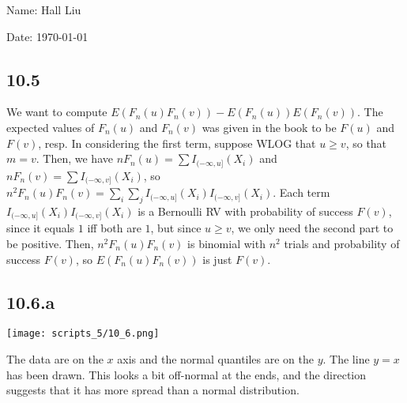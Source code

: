 \documentclass{article}
\begin{document}
Name: Hall Liu

Date: \today 
\vspace{1.5cm}

\subsection*{10.5}
We want to compute $E(F_n(u)F_n(v))-E(F_n(u))E(F_n(v))$. The expected values of $F_n(u)$ and $F_n(v)$ was given in the book to be $F(u)$ and $F(v)$, resp. In considering the first term, suppose WLOG that $u\geq v$, so that $m=v$. Then, we have $nF_n(u)=\sum I_{(-\infty,u]}(X_i)$ and $nF_n(v)=\sum I_{(-\infty,v]}(X_i)$, so $n^2F_n(u)F_n(v)=\sum_i\sum_jI_{(-\infty,u]}(X_i)I_{(-\infty,v]}(X_i)$. Each term $I_{(-\infty,u]}(X_i)I_{(-\infty,v]}(X_i)$ is a Bernoulli RV with probability of success $F(v)$, since it equals $1$ iff both are $1$, but since $u\geq v$, we only need the second part to be positive. Then, $n^2F_n(u)F_n(v)$ is binomial with $n^2$ trials and probability of success $F(v)$, so $E(F_n(u)F_n(v))$ is just $F(v)$.
\subsection*{10.6.a}
\texttt{[image: scripts\_5/10\_6.png]}

The data are on the $x$ axis and the normal quantiles are on the $y$. The line $y=x$ has been drawn. This looks a bit off-normal at the ends, and the direction suggests that it has more spread than a normal distribution.
\end{document}
